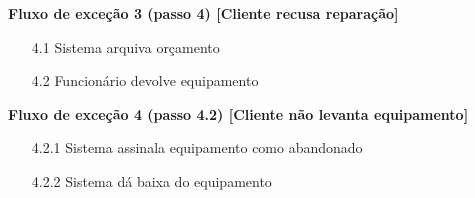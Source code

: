 \documentclass[../relatorio.tex]{subfiles}
\begin{document}
\begin{itemize}
	      \begin{flushleft}
		      \textbf{Fluxo de exceção 3 (passo 4) [Cliente recusa reparação]}
	      \end{flushleft}
	      \begin{itemize}
		      \item[4.1]{Sistema arquiva orçamento}
		      \item[4.2]{Funcionário devolve equipamento}
	      \end{itemize}
	      \begin{flushleft}
		      \textbf{Fluxo de exceção 4 (passo 4.2) [Cliente não levanta equipamento]}
	      \end{flushleft}
	      \begin{itemize}
		      \item[4.2.1]{Sistema assinala equipamento como abandonado}
		      \item[4.2.2]{Sistema dá baixa do equipamento}
	      \end{itemize}
\end{itemize}
\end{document}
